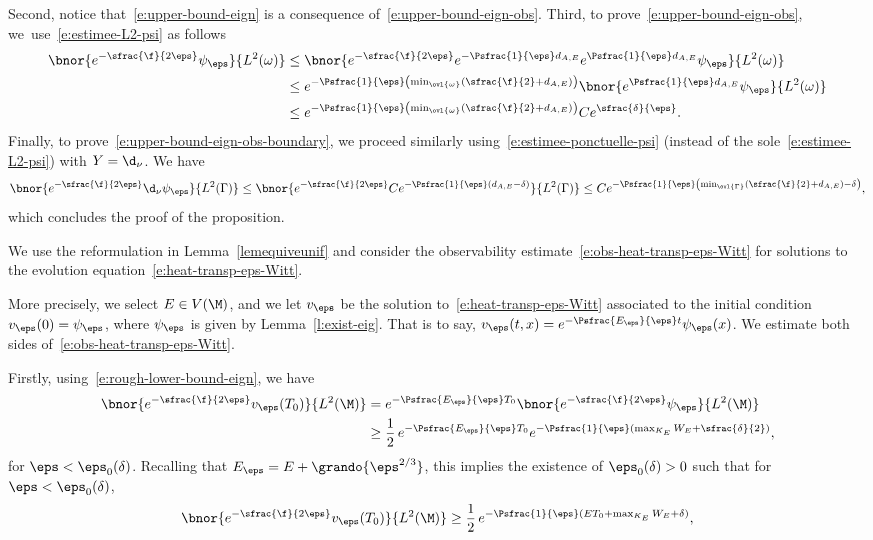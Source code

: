 Second, notice that~\eqref{e:upper-bound-eign} is a consequence of~\eqref{e:upper-bound-eign-obs}. Third, to prove~\eqref{e:upper-bound-eign-obs}, we~use~\eqref{e:estimee-L2-psi} as follows
\begin{align*}
\bnor{e^{-\sfrac{\f}{2\eps}} \psi_\eps }{L^2(\omega)}
& \leq \bnor{e^{-\sfrac{\f}{2\eps}} e^{-\Psfrac{1}{\eps} d_{A,E}} e^{\Psfrac{1}{\eps} d_{A,E}} \psi_\eps }{L^2(\omega)}\\
&\leq e^{-\Psfrac{1}{\eps} \left( \min_{\ovl{\omega}}(\sfrac{\f}{2} + d_{A,E}) \right)} \bnor{e^{\Psfrac{1}{\eps} d_{A,E}} \psi_\eps }{L^2(\omega)} \\
& \leq e^{-\Psfrac{1}{\eps} \left( \min_{\ovl{\omega}}(\sfrac{\f}{2} + d_{A,E}) \right)}C e^{\sfrac{\delta}{\eps}}.
\end{align*}
Finally, to prove~\eqref{e:upper-bound-eign-obs-boundary}, we proceed similarly using~\eqref{e:estimee-ponctuelle-psi} (instead of the sole~\eqref{e:estimee-L2-psi}) with $Y =\d_\nu$. We have
\[
\bnor{e^{-\sfrac{\f}{2\eps}} \d_\nu \psi_\eps }{L^2(\Gamma)} \leq \bnor{e^{-\sfrac{\f}{2\eps}} C e^{-\Psfrac{1}{\eps} (d_{A,E}-\delta)} }{L^2(\Gamma)} \leq C e^{-\Psfrac{1}{\eps} \left( \min_{\ovl{\Gamma}}(\sfrac{\f}{2} + d_{A,E}) -\delta\right)},
\]
which concludes the proof of the proposition.
\enp

We use the reformulation in Lemma~\ref{lemequiveunif} and consider the observability estimate~\eqref{e:obs-heat-transp-eps-Witt} for solutions to the evolution equation~\eqref{e:heat-transp-eps-Witt}.

More precisely, we select $E \in V(\M)$, and we let $v_\eps$ be the solution to~\eqref{e:heat-transp-eps-Witt} associated to the initial condition $v_\eps(0) = \psi_\eps$, where $\psi_\eps$ is given by Lemma~\ref{l:exist-eig}. That is to say, $v_\eps(t,x) = e^{-\Psfrac{E_\eps}{\eps}t}\psi_\eps(x)$. We estimate both sides of~\eqref{e:obs-heat-transp-eps-Witt}.

Firstly, using~\eqref{e:rough-lower-bound-eign}, we have
\begin{align*}
\bnor{e^{-\sfrac{\f}{2\eps}}v_\eps(T_0)}{L^2(\M)} &= e^{-\Psfrac{E_\eps}{\eps}T_0} \bnor{e^{-\sfrac{\f}{2\eps}} \psi_\eps}{L^2(\M)}\\
&\geq \frac12\,e^{-\Psfrac{E_\eps}{\eps}T_0}e^{-\Psfrac{1}{\eps}(\max_{K_E}W_E + \sfrac{\delta}{2})},
\end{align*}
for $\eps < \eps_0(\delta)$. Recalling that $E_\eps = E + \grando{\eps^{2/3}}$, this implies the existence of $\eps_0(\delta)>0$ such that for $\eps < \eps_0(\delta)$,
\[
\bnor{e^{-\sfrac{\f}{2\eps}}v_\eps(T_0)}{L^2(\M)} \geq \frac12\,e^{-\Psfrac{1}{\eps}(E T_0 + \max_{K_E}W_E + \delta)},
\]

